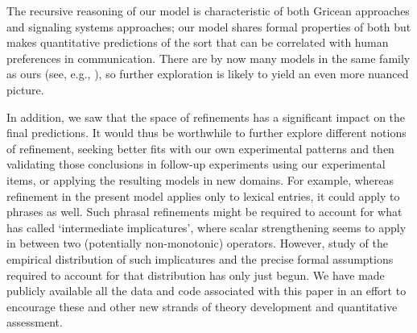 \documentclass[leqno,12pt]{article}
\begin{document}
The recursive reasoning of our model is characteristic of both Gricean
approaches and signaling systems approaches; our model shares formal
properties of both but makes quantitative predictions of the sort that
can be correlated with human preferences in communication. There are
by now many models in the same family as ours (see, e.g.,
\citealt{CamererHo:2004,Jaeger:2011,Smith:Goodman:Frank:2013,Kao-etal:2014,Jaeger:Franke:2014}),
so further exploration is likely to yield an even more nuanced
picture.

In addition, we saw that the space of refinements has a significant
impact on the final predictions. It would thus be worthwhile to
further explore different notions of refinement, seeking better fits
with our own experimental patterns and then validating those
conclusions in follow-up experiments using our experimental items, or
applying the resulting models in new domains.  For example, whereas
refinement in the present model applies only to lexical entries, it
could apply to phrases as well.  Such phrasal refinements might be
required to account for what \citet{Sauerland:2012,Sauerland:2014} has
called `intermediate implicatures', where scalar strengthening seems
to apply in between two (potentially non-monotonic) operators.
However, study of the empirical distribution of such implicatures and
the precise formal assumptions required to account for that
distribution has only just begun.  We have made publicly available all
the data and code associated with this paper in an effort to encourage
these and other new strands of theory development and quantitative
assessment.

\end{document}
